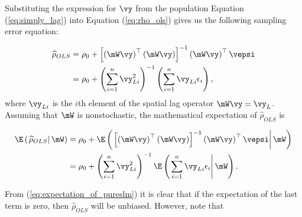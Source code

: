 Substituting the expression for $\vy$ from the population Equation (\ref{eq:simply_lag}) into Equation (\ref{eq:rho_ols}) gives us the following sampling error equation:

\begin{equation*}
  \begin{aligned}
          \widehat{\rho}_{OLS} & = \rho_0 + \left[\left(\mW\vy \right)^\top\left(\mW\vy \right)\right]^{-1}\left(\mW\vy \right)^\top\vepsi \\
                               & = \rho_0 + \left(\sum_{i = 1}^n \vy_{Li}^2\right)^{-1}\left(\sum_{i = 1}^{n}\vy_{Li}\epsilon_i\right),
  \end{aligned}
\end{equation*}
%
where $\vy_{Li}$ is the $i$th element of the spatial lag operator $\mW\vy = \vy_L$. Assuming that $\mW$ is nonstochastic, the mathematical expectation of $\widehat{\rho}_{OLS}$ is

\begin{equation}\label{eq:expectation_of_pureslm}
  \begin{aligned}
\E\left(\left.\widehat{\rho}_{OLS}\right| \mW\right) & = \rho_0 + \E\left(\left.\left[\left(\mW\vy \right)^\top\left(\mW\vy \right)\right]^{-1}\left(\mW\vy \right)^\top\vepsi\right| \mW \right) \\
                         & = \rho_0 + \left(\sum_{i = 1}^n \vy_{Li}^2\right)^{-1}\E\left(\left.\sum_{i = 1}^{n}\vy_{Li}\epsilon_i\right| \mW\right).
  \end{aligned}
\end{equation}

From (\ref{eq:expectation_of_pureslm}) it is clear that if the expectation of the last term is zero, then $\widehat{\rho}_{OLS}$ will be unbiased. However, note that

